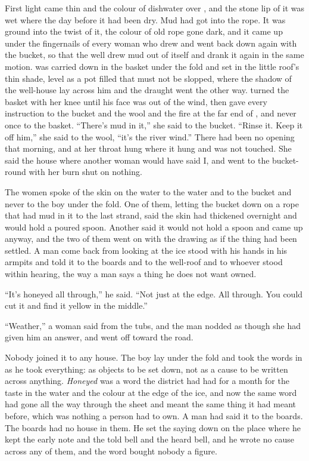 
First light came thin and the colour of dishwater over , and the stone lip of it was wet where the day before it had been dry. Mud had got into the rope. It was ground into the twist of it, the colour of old rope gone dark, and it came up under the fingernails of every woman who drew and went back down again with the bucket, so that the well drew mud out of itself and drank it again in the same motion.  was carried down in the basket under the fold and set in the little roof's thin shade, level as a pot filled that must not be slopped, where the shadow of the well-house lay across him and the draught went the other way.  turned the basket with her knee until his face was out of the wind, then gave every instruction to the bucket and the wool and the fire at the far end of , and never once to the basket. “There's mud in it,” she said to the bucket. “Rinse it. Keep it off him,” she said to the wool, “it's the river wind.” There had been no opening that morning, and  at her throat hung where it hung and was not touched. She said the house where another woman would have said I, and went to the bucket-round with her burn shut on nothing.

The women spoke of the skin on the water to the water and to the bucket and never to the boy under the fold. One of them, letting the bucket down on a rope that had mud in it to the last strand, said the skin had thickened overnight and would hold a poured spoon. Another said it would not hold a spoon and came up anyway, and the two of them went on with the drawing as if the thing had been settled. A man come back from looking at the ice stood with his hands in his armpits and told it to the boards and to the well-roof and to whoever stood within hearing, the way a man says a thing he does not want owned.

“It's honeyed all through,” he said. “Not just at the edge. All through. You could cut it and find it yellow in the middle.”

“Weather,” a woman said from the tubs, and the man nodded as though she had given him an answer, and went off toward the road.

Nobody joined it to any house. The boy lay under the fold and took the words in as he took everything: as objects to be set down, not as a cause to be written across anything. \emph{Honeyed} was a word the district had had for a month for the taste in the water and the colour at the edge of the ice, and now the same word had gone all the way through the sheet and meant the same thing it had meant before, which was nothing a person had to own. A man had said it to the boards. The boards had no house in them. He set the saying down on the place where he kept the early note and the told bell and the heard bell, and he wrote no cause across any of them, and the word bought nobody a figure.

